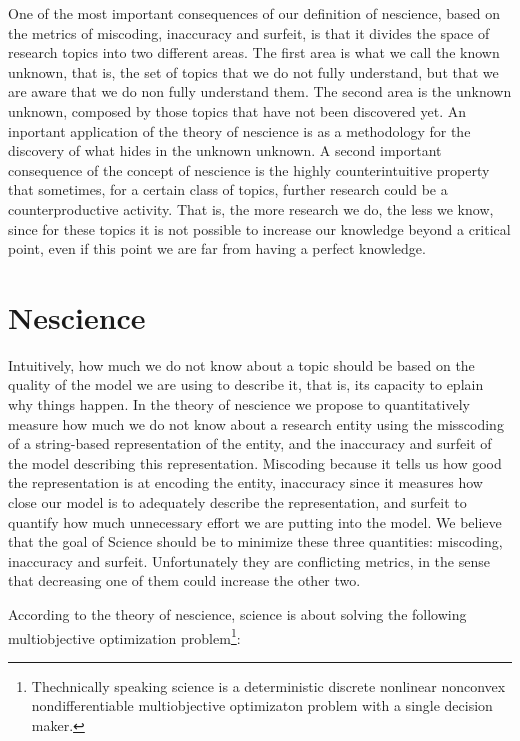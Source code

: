 One of the most important consequences of our definition of nescience, based on the metrics of miscoding, inaccuracy and surfeit, is that it divides the space of research topics into two different areas. The first area is what we call the known unknown, that is, the set of topics that we do not fully understand, but that we are aware that we do non fully understand them. The second area is the unknown unknown, composed by those topics that have not been discovered yet. An inportant application of the theory of nescience is as a methodology for the discovery of what hides in the unknown unknown. A second important consequence of the concept of nescience is the highly counterintuitive property that sometimes, for a certain class of topics, further research could be a counterproductive activity. That is, the more research we do, the less we know, since for these topics it is not possible to increase our knowledge beyond a critical point, even if this point we are far from having a perfect knowledge.

%
%

\section{Nescience}

Intuitively, how much we do not know about a topic should be based on the quality of the model we are using to describe it, that is, its capacity to eplain why things happen. In the theory of nescience we propose to quantitatively measure how much we do not know about a research entity using the misscoding of a string-based representation of the entity, and the inaccuracy and surfeit of the model describing this representation. Miscoding because it tells us how good the representation is at encoding the entity, inaccuracy since it measures how close our model is to adequately describe the representation, and surfeit to quantify how much unnecessary effort we are putting into the model. We believe that the goal of Science should be to minimize these three quantities: miscoding, inaccuracy and surfeit. Unfortunately they are conflicting metrics, in the sense that decreasing one of them could increase the other two.

According to the theory of nescience, science is about solving the following multiobjective optimization problem\footnote{Thechnically speaking science is a deterministic discrete nonlinear nonconvex nondifferentiable multiobjective optimizaton problem with a single decision maker.}:

